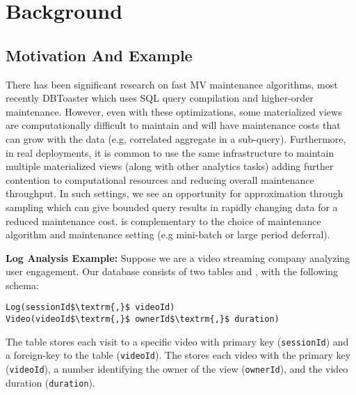 \section{Background}\label{sec-background}

\subsection{Motivation And Example}\label{subsec-inc}
There has been significant research on fast MV maintenance algorithms, most recently DBToaster \cite{DBLP:journals/vldb/KochAKNNLS14} which uses SQL query compilation and higher-order maintenance.
However, even with these optimizations, some materialized views are computationally difficult to maintain and will have maintenance costs that can grow with the data (e.g, correlated aggregate in a sub-query).
Furthermore, in real deployments, it is common to use the same infrastructure to maintain multiple materialized views (along with other analytics tasks) adding further contention to computational resources and reducing overall maintenance throughput.
In such settings, we see an opportunity for approximation through sampling which can give bounded query results in rapidly changing data for a reduced maintenance cost.
\svc is complementary to the choice of maintenance algorithm and maintenance setting (e.g mini-batch or large period deferral).

\vspace{0.5em}

\noindent \textbf{Log Analysis Example: } %
Suppose we are a video streaming company analyzing user engagement.
Our database consists of two tables  and , with the following schema:
\begin{lstlisting}[mathescape,basicstyle={\scriptsize}]
Log(sessionId$\textrm{,}$ videoId)
Video(videoId$\textrm{,}$ ownerId$\textrm{,}$ duration)
\end{lstlisting}
The  table stores each visit to a specific video with primary key (\texttt{sessionId}) and a foreign-key to the  table (\texttt{videoId}).
The  stores each video with the primary key (\texttt{videoId}), a number identifying the owner of the view (\texttt{ownerId}), and the video duration (\texttt{duration}).

